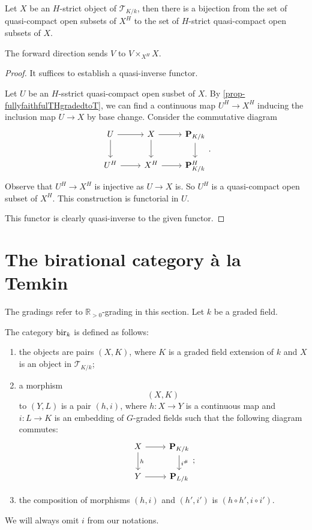 \begin{proposition}
    Let $X$ be an $H$-strict object of $\mathcal{T}_{K/k}$, then there is a bijection from the set of quasi-compact open subsets of $X^{H}$ to the set of $H$-strict quasi-compact open subsets of $X$.

    The forward direction sends $V$ to $V\times_{X^{H}}X$.
\end{proposition}
\begin{proof}
    It suffices to establish a quasi-inverse functor.

    Let $U$ be an $H$-sstrict quasi-compact open susbet of $X$. By \cref{prop-fullyfaithfulTHgradedtoT}, we can find a continuous map $U^H\rightarrow X^H$ inducing the inclusion map $U\rightarrow X$ by base change. Consider the commutative diagram
    \[
        \begin{tikzcd}
            U \arrow[r] \arrow[d] & X \arrow[r] \arrow[d] & \mathbf{P}_{K/k} \arrow[d] \\
            U^H \arrow[r]         & X^H \arrow[r]         & \mathbf{P}_{K/k}^H        
            \end{tikzcd}.  
    \]
    Observe that $U^H\rightarrow X^H$ is injective as $U\rightarrow X$ is. So $U^H$ is a quasi-compact open subset of $X^H$. This construction is functorial in $U$.

    This functor is clearly quasi-inverse to the given functor.
\end{proof}

\section{The birational category à la Temkin}
The gradings refer to $\mathbb{R}_{>0}$-grading in this section. Let $k$ be a graded field.

\begin{definition}
    The category $\mathrm{bir}_k$ is defined as follows: 
    \begin{enumerate}
        \item the objects are pairs $(X,K)$, where $K$ is a graded field extension of $k$ and $X$ is an object in $\mathcal{T}_{K/k}$;
        \item a morphism $$(X,K)$$ to $(Y,L)$ is a pair $(h,i)$, where $h:X\rightarrow Y$ is a continuous map and $i:L\rightarrow K$ is an embedding of $G$-graded fields such that the following diagram commutes:
        \[
            \begin{tikzcd}
                X \arrow[d, "h"] \arrow[r] & \mathbf{P}_{K/k} \arrow[d, "i^{\#}"] \\
                Y \arrow[r]                & \mathbf{P}_{L/k}                    
            \end{tikzcd};
        \]
        \item the composition of morphisms $(h,i)$ and $(h',i')$ is $(h\circ h',i\circ i')$.
    \end{enumerate}
\end{definition}
We will always omit $i$ from our notations.

